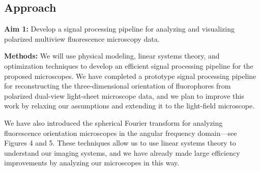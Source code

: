 \documentclass[11pt, draft]{article}
\begin{document}
\subsection*{Approach}
\noindent\textbf{Aim 1:} Develop a signal processing pipeline for analyzing and
  visualizing polarized multiview fluorescence microscopy data.

  \noindent\textbf{Methods:} We will use physical modeling, linear systems
  theory, and optimization techniques to develop an efficient signal processing
  pipeline for the proposed microscopes. We have completed a prototype signal
  processing pipeline for reconstructing the three-dimensional orientation of
  fluorophores from polarized dual-view light-sheet microscope data, and we plan
  to improve this work by relaxing our assumptions and extending it to the
  light-field microscope.

  We have also introduced the spherical Fourier transform for analyzing
  fluorescence orientation microscopes in the angular frequency domain---see
  Figures 4 and 5. These techniques allow us to use linear systems theory to
  understand our imaging systems, and we have already made large efficiency
  improvements by analyzing our microscopes in this way.
  
\end{document}
